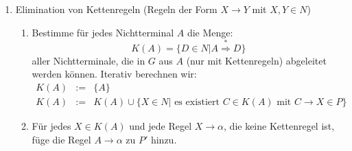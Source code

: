 \documentclass[11pt]{article} %
\theoremstyle{definition}
\newtheorem*{beispiel}{Beispiel}
\newtheorem{definition}{Definition}
\begin{document}
\begin{enumerate}[(1)]
\begin{enumerate}
Bestimmung der Menge der produktiven Nichtterminale: Sei $G = (\Sigma, N, P, S)$ eine kontextfreie Grammatik.
\begin{enumerate}
\item $\textrm{Prod} := \{A \in N | A \rightarrow w \in P, w \in \Sigma^* \} $.
\item Für alle $A \in N$: Falls $A \rightarrow \alpha \in P$ mit $\alpha \in (\Sigma \cup \textrm{Prod})^*$, füge $A$ zu $\textrm{Prod}$ hinzu. Wiederhole solange, bis sich $\textrm{Prod}$ nicht mehr ändert.
\item Reduziere die Grammatik zu $G' = (\Sigma, \textrm{Prod}, P', S)$ mit
\[
P' = \{ A \rightarrow \alpha \in P | A \in \textrm{Prod} \textrm{ und } \alpha \in (\textrm{Prod} \cup \Sigma)^* \}
\]
\end{enumerate}

\end{enumerate}

\begin{beispiel}
Betrachte die kontextfreie Grammatik
\[
G = (\{a,b,c\}, \{S,A,B,C\}, P, S)
\] mit \[
P = \{S \rightarrow A, S \rightarrow AB, A \rightarrow Aa, B \rightarrow bB, B \rightarrow Bb, C \rightarrow c \}
\]

Erreichbare Symbole: $\{ S, A, B, a, b \}$

Also erhalten wir die Grammatik $G' = (\{a,b\}, \{S,A,B\}, P', S)$ mit
\[
P' = \{S \rightarrow A, S \rightarrow AB, A \rightarrow Aa, A \rightarrow a, B \rightarrow bB, B \rightarrow Bb \}.
\]

Produktive Nichtterminale in $G'$: $\{ S, A \}$.

Reduzierte Grammatik $G'' = (\{a,b\}, \{S, A\}, P'', S)$ mit
\[
P'' = \{S \rightarrow A, A \rightarrow Aa, A \rightarrow a \}
\]
\end{beispiel}

\begin{definition}
Eine kontextfreie Grammatik $G$ heisst reduziert, falls sie keine unproduktiven und keine nichterreichbaren Symbole enthält.
\end{definition}

\item Elimination von Kettenregeln (Regeln der Form $X \rightarrow Y$ mit $X, Y \in N$)

\begin{enumerate}
\item Bestimme für jedes Nichtterminal $A$ die Menge:
\[
	K(A) = \{ D \in N | A \overset{*}{\Rightarrow} D \}
\]
aller Nichtterminale, die in $G$ aus $A$ (nur mit Kettenregeln) abgeleitet werden können.
Iterativ berechnen wir:
\begin{eqnarray*}
K(A) &:=& \{ A \}\\
K(A) &:=& K(A) \cup \{ X \in N | \textrm{ es existiert } C \in K(A) \textrm{ mit } C \rightarrow X \in P \}
\end{eqnarray*}
\item Für jedes $X \in K(A)$ und jede Regel $X\rightarrow \alpha$, die keine Kettenregel ist, füge die Regel $A\rightarrow \alpha$ zu $P'$ hinzu.
\end{enumerate}


\end{enumerate}
\end{document}
